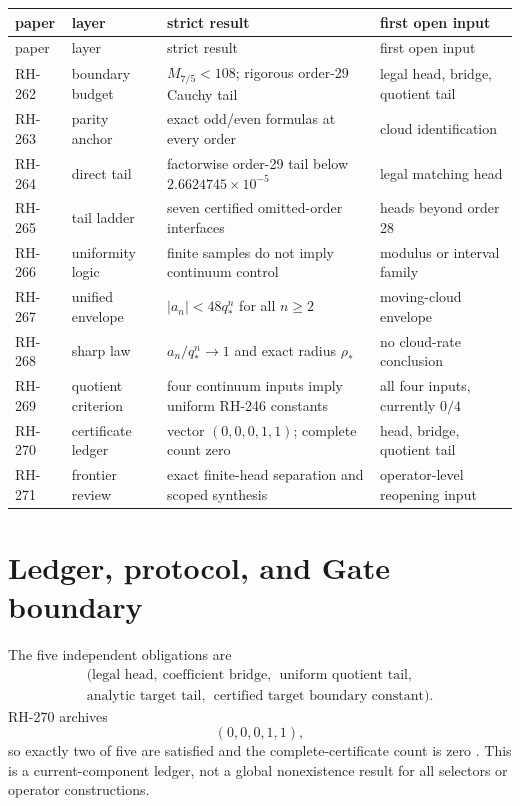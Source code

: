 \documentclass[11pt]{article}
\theoremstyle{remark}
\begin{document}
\small
\begin{longtable}{>{\raggedright\arraybackslash}p{}
>{\raggedright\arraybackslash}p{}
>{\raggedright\arraybackslash}p{}
>{\raggedright\arraybackslash}p{}}
\toprule
paper & layer & strict result & first open input\\
\midrule
\endfirsthead
\toprule
paper & layer & strict result & first open input\\
\midrule
\endhead
RH-262 & boundary budget & $M_{7/5}<108$; rigorous order-29 Cauchy tail & legal head, bridge, quotient tail\\
RH-263 & parity anchor & exact odd/even formulas at every order & cloud identification\\
RH-264 & direct tail & factorwise order-29 tail below $2.6624745\times10^{-5}$ & legal matching head\\
RH-265 & tail ladder & seven certified omitted-order interfaces & heads beyond order 28\\
RH-266 & uniformity logic & finite samples do not imply continuum control & modulus or interval family\\
RH-267 & unified envelope & $|a_n|<48q_*^n$ for all $n\ge2$ & moving-cloud envelope\\
RH-268 & sharp law & $a_n/q_*^n\to1$ and exact radius $\rho_*$ & no cloud-rate conclusion\\
RH-269 & quotient criterion & four continuum inputs imply uniform RH-246 constants & all four inputs, currently $0/4$\\
RH-270 & certificate ledger & vector $(0,0,0,1,1)$; complete count zero & head, bridge, quotient tail\\
RH-271 & frontier review & exact finite-head separation and scoped synthesis & operator-level reopening input\\
\bottomrule
\end{longtable}
\normalsize

\section{Ledger, protocol, and Gate boundary}

The five independent obligations are
\[
 \begin{gathered}
 (\text{legal head},\ \text{coefficient bridge},\
 \ \text{uniform quotient tail},\\
 \text{analytic target tail},\
 \ \text{certified target boundary constant}).
 \end{gathered}
\]
RH-270 archives
\begin{equation}
 \boxed{(0,0,0,1,1)},
 \label{eq:ledger}
\end{equation}
so exactly two of five are satisfied and the complete-certificate count is
zero \citep{WangRH270}.  This is a current-component ledger, not a global
nonexistence result for all selectors or operator constructions.
\end{document}
